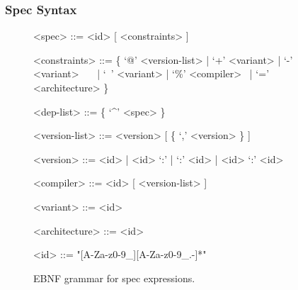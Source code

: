 \subsubsection{Spec Syntax}\label{sec:syntax}
\begin{figure}
{\selectfont
\begin{grammar}\small
  <spec>         ::= <id> [ <constraints> ]

  <constraints>   ::= \{ `@' <version-list> | `+' <variant> \newline
                   | `-' <variant> ~~~| `~' <variant> \newline
                   | `\%' <compiler> ~| `=' <architecture> \} 

  <dep-list>  ::= \{ `\textsf \textasciicircum' <spec> \}

  <version-list> ::= <version> [ \{ `,' <version> \} ]

  <version>      ::= <id> | <id> `:' | `:' <id> | <id> `:' <id>

  <compiler>     ::= <id> [ <version-list> ]

  <variant>      ::= <id>

  <architecture> ::= <id>

  <id>           ::= "[A-Za-z0-9_][A-Za-z0-9_.-]*"
\end{grammar}
} %
\caption{
	EBNF grammar for spec expressions.
	\label{fig:grammar}
}
\end{figure}


